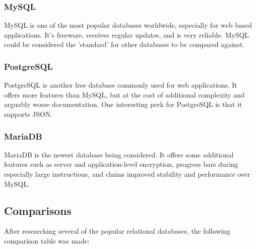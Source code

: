 \documentclass[onecolumn, draftclsnofoot, 10pt, compsoc]{IEEEtran}
\begin{document}
\subsubsection{MySQL}
MySQL is one of the most popular databases worldwide, especially for web based applications.  It's freeware, receives regular updates, and is very reliable.  MySQL could be considered the 'standard' for other databases to be compared against.

\subsubsection{PostgreSQL}
PostgreSQL is another free database commonly used for web applications.  It offers more features than MySQL, but at the cost of additional complexity and arguably worse documentation.  One interesting perk for PostgreSQL is that it supports JSON.

\subsubsection{MariaDB}
MariaDB is the newest database being considered.  It offers some additional features such as server and application-level encryption, progress bars during especially large instructions, and claims improved stability and performance over MySQL.

\subsection{Comparisons}
After researching several of the popular relational databases, the following comparison table was made\cite{5}\cite{6}\cite{7}:
\end{document}
